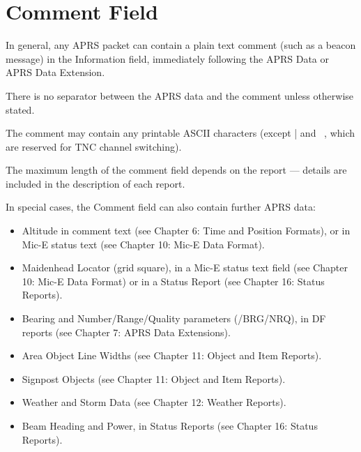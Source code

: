 \renewcommand{\arraystretch}{\arrystrchfactor}

\clearpage


\section{Comment Field}

In general, any APRS packet can contain a plain text comment (such as a
beacon message) in the Information field, immediately following the APRS
Data or APRS Data Extension.

There is no separator between the APRS data and the comment unless
otherwise stated.

The comment may contain any printable ASCII characters (except | and ~,
which are reserved for TNC channel switching).

The maximum length of the comment field depends on the report — details
are included in the description of each report.

In special cases, the Comment field can also contain further APRS data:

\begin{itemize}


\item Altitude in comment text (see Chapter 6: Time and Position Formats), or
in Mic-E status text (see Chapter 10: Mic-E Data Format).

\item Maidenhead Locator (grid square), in a Mic-E status text field (see
Chapter 10: Mic-E Data Format) or in a Status Report (see Chapter 16:
Status Reports).

\item Bearing and Number/Range/Quality parameters (/BRG/NRQ), in DF
reports (see Chapter 7: APRS Data Extensions).

\item Area Object Line Widths (see Chapter 11: Object and Item Reports).

\item Signpost Objects (see Chapter 11: Object and Item Reports).

\item Weather and Storm Data (see Chapter 12: Weather Reports).

\item Beam Heading and Power, in Status Reports (see Chapter 16: Status
Reports).

\end{itemize}

